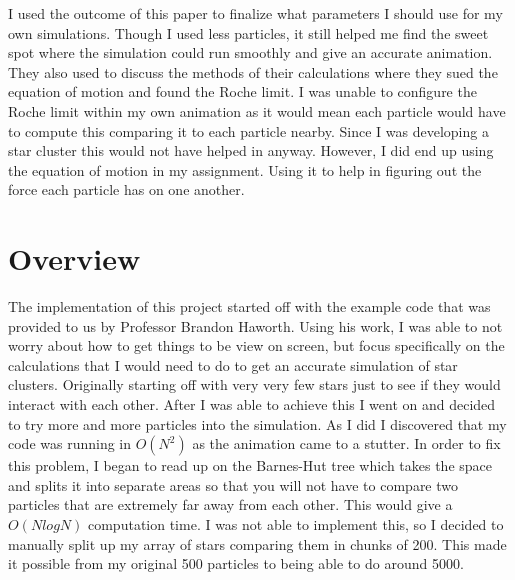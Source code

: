 \documentclass{egpubl}
\begin{document}
    I used the outcome of this paper to finalize what parameters I should use for my own simulations. Though I used less particles, it still helped me find the sweet spot where the simulation could run smoothly and give an accurate animation. They also used to discuss the methods of their calculations where they sued the equation of motion and found the Roche limit. I was unable to configure the Roche limit within my own animation as it would mean each particle would have to compute this comparing it to each particle nearby. Since I was developing a star cluster this would not have helped in anyway. However, I did end up using the equation of motion in my assignment. Using it to help in figuring out the force each particle has on one another. 

\section{Overview}

    The implementation of this project started off with the example code that was provided to us by Professor Brandon Haworth. Using his work, I was able to not worry about how to get things to be view on screen, but focus specifically on the calculations that I would need to do to get an accurate simulation of star clusters. Originally starting off with very very few stars just to see if they would interact with each other. After I was able to achieve this I went on and decided to try more and more particles into the simulation. As I did I discovered that my code was running in $O(N^2)$ as the animation came to a stutter. In order to fix this problem, I began to read up on the Barnes-Hut tree which takes the space and splits it into separate areas so that you will not have to compare two particles that are extremely far away from each other. This would give a $O(NlogN)$ computation time. I was not able to implement this, so I decided to manually split up my array of stars comparing them in chunks of 200. This made it possible from my original 500 particles to being able to do around 5000.
\end{document}
